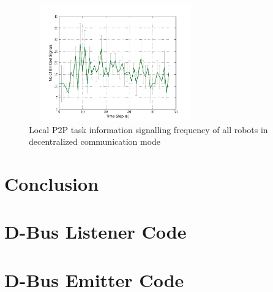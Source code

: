 \documentclass{ifacconf}
\begin{document}
\begin{figure}
\begin{center}
\includegraphics[width=7.5cm,height=5cm]{./images/Local-500cm-SignalingFreqStat}    %
\caption{Local P2P task information signalling frequency of all robots in decentralized communication mode} 
\label{fig:global-freq}
\end{center}
\end{figure}



\section{Conclusion}



                                                   
\appendix
\section{D-Bus Listener Code}    %

\section{D-Bus Emitter Code}              %
\end{document}
